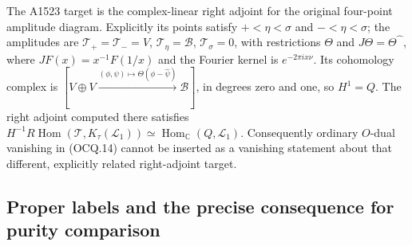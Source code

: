 The A1523 target is the complex-linear right adjoint for the original
four-point amplitude diagram.  Explicitly its points satisfy
$+<\eta<\sigma$ and $-<\eta<\sigma$; the amplitudes are
$\mathcal T_+=\mathcal T_-=V$, $\mathcal T_\eta=\mathscr B$,
$\mathcal T_\sigma=0$, with restrictions $\Theta$ and
$J\Theta=\Theta\widehat{\phantom\phi}$, where
$JF(x)=x^{-1}F(1/x)$ and the Fourier kernel is $e^{-2\pi ix\nu}$.
Its cohomology complex is
$[V\oplus V\xrightarrow{(\phi,\psi)\mapsto\Theta(\phi-\widehat\psi)}
\mathscr B]$, in degrees zero and one, so $H^1=Q$.
The right adjoint computed there satisfies
$H^{-1}R\operatorname{Hom}(\mathcal T,K_\tau(\mathcal L_1))
\simeq\operatorname{Hom}_{\mathbb C}(Q,\mathcal L_1)$.
Consequently ordinary $O$-dual vanishing in (OCQ.14) cannot be inserted
as a vanishing statement about that different, explicitly related
right-adjoint target.

\subsection{Proper labels and the precise consequence for purity comparison}

